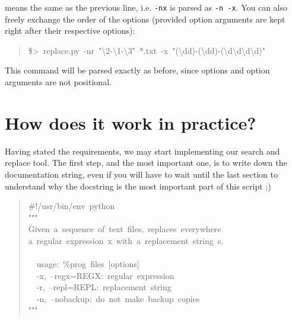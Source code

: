 \documentclass[10pt,english]{article}
\begin{document}
means the same as the previous line, i.e. \texttt{-nx} is parsed as
\texttt{-n -x}.  You can also freely exchange the order of the options
(provided option arguments are kept right 
after their respective options):
\begin{quote}
\begin{ttfamily}\begin{flushleft}
\mbox{{\$}>~replace.py~-nr~"{\textbackslash}2-{\textbackslash}1-{\textbackslash}3"~*.txt~-x~"({\textbackslash}dd)-({\textbackslash}dd)-({\textbackslash}d{\textbackslash}d{\textbackslash}d{\textbackslash}d)"}
\end{flushleft}\end{ttfamily}
\end{quote}

This command will be parsed exactly as before, since options and option 
arguments are not positional.



\hypertarget{how-does-it-work-in-practice}{}
\section*{How does it work in practice?}

Having stated the requirements, we may start implementing our 
search and replace tool. The first step, and the most important
one, is to write down the documentation string, even if you 
will have to wait until the last section to understand
why the docstring is the most important part of this script ;)
\begin{quote}
\begin{ttfamily}\begin{flushleft}
\mbox{{\#}!/usr/bin/env~python}\\
\mbox{"""}\\
\mbox{Given~a~sequence~of~text~files,~replaces~everywhere}\\
\mbox{a~regular~expression~x~with~a~replacement~string~s.}\\
\mbox{}\\
\mbox{~~usage:~{\%}prog~files~[options]}\\
\mbox{~~-x,~--regx=REGX:~regular~expression}\\
\mbox{~~-r,~--repl=REPL:~replacement~string}\\
\mbox{~~-n,~--nobackup:~do~not~make~backup~copies}\\
\mbox{"""}
\end{flushleft}\end{ttfamily}
\end{quote}
\end{document}
